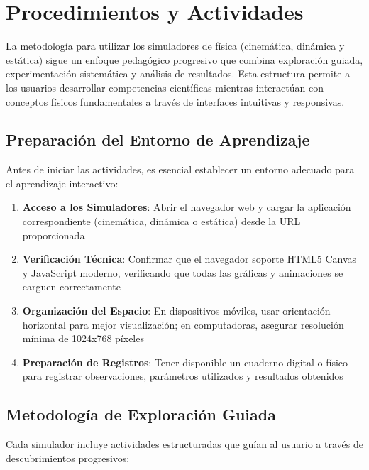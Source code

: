 \section{Procedimientos y Actividades}

La metodología para utilizar los simuladores de física (cinemática, dinámica y estática) sigue un enfoque pedagógico progresivo que combina exploración guiada, experimentación sistemática y análisis de resultados. Esta estructura permite a los usuarios desarrollar competencias científicas mientras interactúan con conceptos físicos fundamentales a través de interfaces intuitivas y responsivas.

\subsection{Preparación del Entorno de Aprendizaje}

Antes de iniciar las actividades, es esencial establecer un entorno adecuado para el aprendizaje interactivo:

\begin{enumerate}
    \item \textbf{Acceso a los Simuladores}: Abrir el navegador web y cargar la aplicación correspondiente (cinemática, dinámica o estática) desde la URL proporcionada
    \item \textbf{Verificación Técnica}: Confirmar que el navegador soporte HTML5 Canvas y JavaScript moderno, verificando que todas las gráficas y animaciones se carguen correctamente
    \item \textbf{Organización del Espacio}: En dispositivos móviles, usar orientación horizontal para mejor visualización; en computadoras, asegurar resolución mínima de 1024x768 píxeles
    \item \textbf{Preparación de Registros}: Tener disponible un cuaderno digital o físico para registrar observaciones, parámetros utilizados y resultados obtenidos
\end{enumerate}

\subsection{Metodología de Exploración Guiada}

Cada simulador incluye actividades estructuradas que guían al usuario a través de descubrimientos progresivos:

